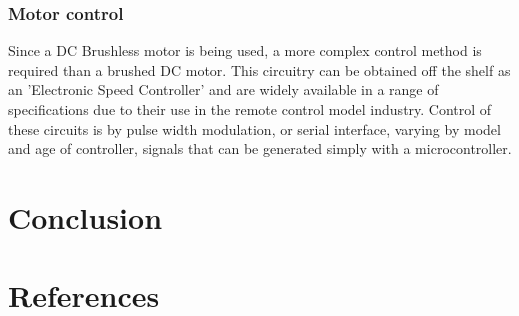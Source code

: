 \documentclass[journal,10pt]{IEEEtran}
\begin{document}
    	\subsubsection{Motor control}
    		Since a DC Brushless motor is being used, a more complex control method is required than a brushed DC motor.
    		This circuitry can be obtained off the shelf as an 'Electronic Speed Controller' and are widely available in a range of specifications due to their use in the remote control model industry.
    		Control of these circuits is by pulse width modulation, or serial interface, varying by model and age of controller, signals that can be generated simply with a microcontroller.
\section{Conclusion}
\section{References}
\end{document}
